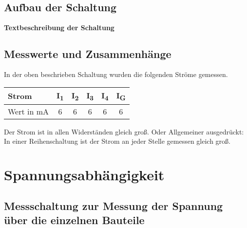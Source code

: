 \documentclass[
a4paper,     %
12pt         %
]{scrartcl}  %
\begin{document}
\subsection{Aufbau der Schaltung}

\textbf{Textbeschreibung der Schaltung}

\subsection{Messwerte und Zusammenhänge}

In der oben beschrieben Schaltung wurden die folgenden Ströme gemessen.
\begin{center}
  \begin{tabular}{ l | c | c | c | c | c}
    \hline
    Strom      & I\textsubscript{1} & I\textsubscript{2} & I\textsubscript{3} & I\textsubscript{4} & I\textsubscript{G} \\ \hline
    Wert in mA & 6 & 6 & 6 & 6 & 6 \\
    \hline
  \end{tabular}
\end{center}
Der Strom ist in allen Widerständen gleich groß. Oder Allgemeiner ausgedrückt: In einer Reihenschaltung ist der Strom an jeder Stelle gemessen gleich groß.

\section{Spannungsabhängigkeit}
\subsection{Messschaltung zur Messung der Spannung über die einzelnen Bauteile}
\end{document}
